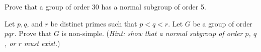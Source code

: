 \begin{problem}\label{problem-group-of-order-30-has-normal-subgroup-of-order-5}
    Prove that a group of order 30 has a normal subgroup of order 5.
\end{problem}

\begin{problem}\label{problem-group-of-order-pqr-is-non-simple}
    Let $p, q$, and $r$ be distinct primes such that $p < q < r$. Let $G$ be a group of order $pqr$. Prove that $G$ is non-simple.\newline
    (\textit{Hint: show that a normal subgroup of order $p$, $q$, or $r$ must exist.})
\end{problem}
